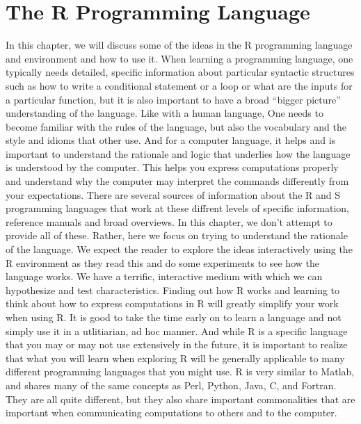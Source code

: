 	
\chapter{The R Programming Language}
\label{chap:RIntro}
In this chapter, we will discuss some of the ideas in the R programming language and environment and how to use it. When learning a programming language, one typically needs detailed, specific information about particular syntactic structures such as how to write a conditional statement or a loop or what are the inputs for a particular function, but it is also important to have a broad ``bigger picture'' understanding of the language. Like with a human language, One needs to become familiar with the rules of the language, but also the vocabulary and the style and idioms that other use. And for a computer language, it helps and is important to understand the rationale and logic that underlies how the language is understood by the computer. This helps you express computations properly and understand why the computer may interpret the commands differently from your expectations. There are several sources of information about the R and S programming languages that work at these diffrent levels of specific information, reference manuals and broad overviews. In this chapter, we don't attempt to provide all of these. Rather, here we focus on trying to understand the rationale of the language. We expect the reader to explore the ideas interactively using the R environment as they read this and do some experiments to see how the language works. We have a terrific, interactive medium with which we can hypothesize and test characteristics. Finding out how R works and learning to think about how to express computations in R will greatly simplify your work when using R. It is good to take the time early on to learn a language and not simply use it in a utlitiarian, ad hoc manner. And while R is a specific language that you may or may not use extensively in the future, it is important to realize that what you will learn when exploring R will be generally applicable to many different programming languages that you might use. R is very similar to Matlab, and shares many of the same concepts as Perl, Python, Java, C, and Fortran. They are all quite different, but they also share important commonalities that are important when communicating computations to others and to the computer. 

